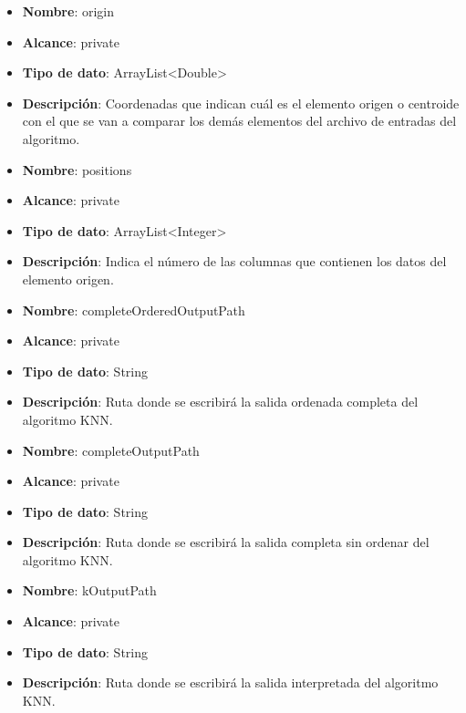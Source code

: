 \begin{UClist}
\begin{itemize}
	\end{itemize}
	\begin{itemize}
		\item \textbf{Nombre}: origin
		\item \textbf{Alcance}: private
		\item \textbf{Tipo de dato}: ArrayList<Double>
		\item \textbf{Descripción}: Coordenadas que indican cuál es el elemento origen o centroide con el que se van a comparar los demás elementos del archivo de entradas del algoritmo.\\
	\end{itemize}
	\begin{itemize}
		\item \textbf{Nombre}: positions
		\item \textbf{Alcance}: private
		\item \textbf{Tipo de dato}: ArrayList<Integer>
		\item \textbf{Descripción}: Indica el número de las columnas que contienen los datos del elemento origen. \\
	\end{itemize}
	\begin{itemize}
		\item \textbf{Nombre}: completeOrderedOutputPath
		\item \textbf{Alcance}: private
		\item \textbf{Tipo de dato}: String
		\item \textbf{Descripción}: Ruta donde se escribirá la salida ordenada completa del algoritmo KNN.\\
	\end{itemize}
	\begin{itemize}
		\item \textbf{Nombre}: completeOutputPath
		\item \textbf{Alcance}: private
		\item \textbf{Tipo de dato}: String
		\item \textbf{Descripción}: Ruta donde se escribirá la salida completa sin ordenar del algoritmo KNN.\\
	\end{itemize}
	\begin{itemize}
		\item \textbf{Nombre}: kOutputPath
		\item \textbf{Alcance}: private
		\item \textbf{Tipo de dato}: String
		\item \textbf{Descripción}: Ruta donde se escribirá la salida interpretada del algoritmo KNN.\\

\end{itemize}
\end{UClist}
